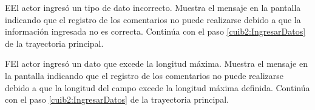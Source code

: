         \begin{UCtrayectoriaA}{E}{El actor ingresó un tipo de dato incorrecto.}    
    \UCpaso[\UCsist] Muestra el mensaje  en la pantalla  indicando que el registro de los comentarios no puede realizarse debido a que la información ingresada no es correcta.
    \UCpaso[] Continúa con el paso \ref{cuib2:IngresarDatos} de la trayectoria principal.     
    \end{UCtrayectoriaA}
    
            \begin{UCtrayectoriaA}{F}{El actor ingresó un dato que excede la longitud máxima.}    
    \UCpaso[\UCsist] Muestra el mensaje  en la pantalla  indicando que el registro de los comentarios no puede realizarse debido a que la longitud del campo excede la longitud máxima definida.
    \UCpaso[] Continúa con el paso \ref{cuib2:IngresarDatos} de la trayectoria principal.     
    \end{UCtrayectoriaA}
    